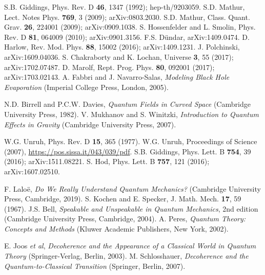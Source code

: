 \documentclass[12pt]{article}
\begin{document}
 





\begin{thebibliography}{99}

S.B. Giddings, Phys. Rev. D {\bf 46}, 1347 (1992); hep-th/9203059. 
S.D. Mathur, Lect. Notes Phys. {\bf 769}, 3 (2009); arXiv:0803.2030.
S.D. Mathur, Class. Quant. Grav. {\bf 26}, 224001 (2009); arXiv:0909.1038.
S. Hossenfelder and L. Smolin, Phys. Rev. D {\bf 81}, 064009 (2010); arXiv:0901.3156.
F.S. D\"undar, arXiv:1409.0474.
D. Harlow, Rev. Mod. Phys. {\bf 88}, 15002 (2016); arXiv:1409.1231.
J. Polchinski, arXiv:1609.04036.
S. Chakraborty and K. Lochan, Universe {\bf 3}, 55 (2017); arXiv:1702.07487.
D. Marolf, Rept. Prog. Phys. {\bf 80}, 092001 (2017); arXiv:1703.02143.
A. Fabbri and J. Navarro-Salas, {\it Modeling Black Hole Evaporation}
(Imperial College Press, London, 2005).

N.D. Birrell and P.C.W. Davies, {\it Quantum Fields in Curved Space} (Cambridge University Press, 1982).
V. Mukhanov and S. Winitzki, {\it Introduction to Quantum Effects in Gravity} (Cambridge University Press, 2007).

W.G. Unruh, Phys. Rev. D {\bf 15}, 365 (1977).
W.G. Unruh, Proceedings of Science (2007), \url{https://pos.sissa.it/043/039/pdf}.
S.B. Giddings, Phys. Lett. B {\bf 754}, 39 (2016); arXiv:1511.08221.
S. Hod, Phys. Lett. B {\bf 757}, 121 (2016); arXiv:1607.02510.

F. Lalo\"e, {\it Do We Really Understand Quantum Mechanics?} (Cambridge University Press, Cambridge, 2019).
S. Kochen and E. Specker, J. Math. Mech. {\bf 17}, 59 (1967).
J.S. Bell, {\it Speakable and Unspeakable in Quantum Mechanics}, 
2nd edition (Cambridge University Press, Cambridge, 2004).
A. Peres, {\it Quantum Theory: Concepts and Methods} (Kluwer Academic Publishers, New York, 2002).

E. Joos {\it et al}, {\it Decoherence and the Appearance of a Classical World in Quantum Theory}
(Springer-Verlag, Berlin, 2003).
M. Schlosshauer, {\it Decoherence and the Quantum-to-Classical Transition}
(Springer, Berlin, 2007).


\end{thebibliography}
\end{document}
